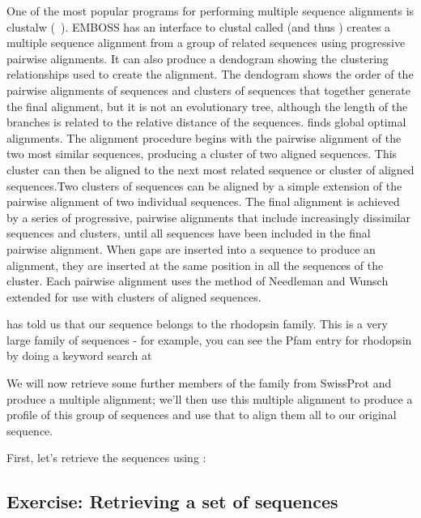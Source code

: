 \documentclass[12pt]{report}
\begin{document}
One of the most	popular	programs for performing	multiple sequence
alignments is clustalw (~\cite{Thompson:94}). EMBOSS has an interface to clustal
called 
 (and thus ) creates a
multiple sequence alignment from a group of related sequences using
progressive pairwise alignments. It can	also produce a dendogram
showing	the clustering relationships used to create the	alignment.
The dendogram shows the	order of the pairwise alignments of sequences
and clusters of	sequences that together	generate the final alignment,
but it is not an evolutionary tree, although the length	of the
branches is related to the relative distance of	the sequences.
 finds global optimal alignments.	The alignment
procedure begins with the pairwise alignment of	the two	most similar
sequences, producing a cluster of two aligned sequences.  This cluster
can then be aligned to the next	most related sequence or cluster of
aligned	sequences.Two clusters of sequences can	be aligned by a	simple
extension of the pairwise alignment of two individual sequences.  The
final alignment	is achieved by a series	of progressive,	pairwise
alignments that	include	increasingly dissimilar	sequences and
clusters, until	all sequences have been	included in the	final pairwise
alignment.  When gaps are inserted into	a sequence to produce an
alignment, they	are inserted at	the same position in all the sequences
of the cluster.	Each pairwise alignment	uses the method	of Needleman
and Wunsch extended for	use with clusters of aligned sequences.

 has told us that our sequence belongs to the
rhodopsin family. This is a very large family of sequences - for
example, you can see the Pfam entry for	rhodopsin by doing a keyword
search at\\

We will	now retrieve some further members of the family	from SwissProt
and produce a multiple alignment; we'll	then use this multiple
alignment to produce a profile of this group of	sequences and use that
to align them all to our original sequence.

First, let's retrieve the sequences using :

\subsection*{Exercise: Retrieving a set	of sequences}
\end{document}
